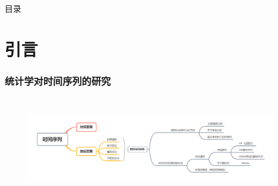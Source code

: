\documentclass[10pt,t,handout]{beamer}
\begin{document}
\begin{frame}{目录}
	\tableofcontents
\end{frame}
\section{引言} 
 \begin{frame} 
\frametitle{统计学对时间序列的研究} 
  	\begin{figure}
  	\centering
  	\includegraphics[width=11cm,height=4.5cm]{时间序列.png}	
  	\label{fig:caps}
  \end{figure}
 \end{frame}
\end{document}

